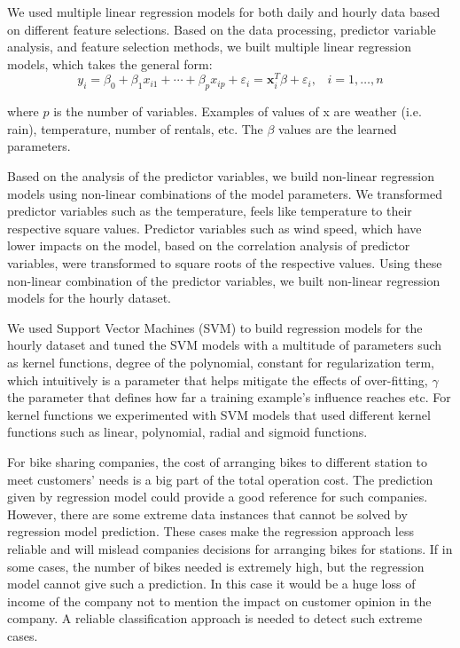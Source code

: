 \documentclass[12pt]{article}
\begin{document}


We used multiple linear regression models for both daily and hourly data based
on different feature selections.  Based on the data processing, predictor
variable analysis, and feature selection methods, we built multiple linear
regression models, which takes the general form:
\begin{equation}
y_i = \beta_0 + \beta_1x_{i1} + \cdots + \beta_px_{ip} + \varepsilon_i = {\mathbf
x}_i^{T}\beta + \varepsilon_i, \; \; \; i = 1, \ldots, n
\end{equation}

where $p$ is the number of variables. Examples of values of x are weather
(i.e. rain), temperature, number of rentals, etc. The $\beta$ values are the
learned parameters.



Based on the analysis of the predictor variables, we build non-linear
regression models using non-linear combinations of the model parameters. We
transformed predictor variables such as the temperature, feels like temperature
to their respective square values. Predictor variables such as wind speed, which
have lower impacts on the model, based on the correlation analysis of predictor
variables, were transformed to square roots of the respective values.  Using
these non-linear combination of the predictor variables, we built non-linear
regression models for the hourly dataset.



We used Support Vector Machines (SVM) to build regression models for the hourly
dataset and tuned the SVM models with a multitude of parameters such as kernel
functions, degree of the polynomial, constant for regularization term, which
intuitively is a parameter that helps mitigate the effects of over-fitting,
$\gamma$ the parameter that defines how far a training example's influence
reaches etc. For kernel functions we experimented with SVM models that used
different kernel functions such as linear, polynomial, radial and sigmoid
functions.



For bike sharing companies, the cost of arranging bikes to different station to
meet customers' needs is a big part of the total operation cost. The prediction
given by regression model could provide a good reference for such
companies. However, there are some extreme data instances that cannot be solved
by regression model prediction. These cases make the regression approach less
reliable and will mislead companies decisions for arranging bikes for
stations. If in some cases, the number of bikes needed is extremely high, but
the regression model cannot give such a prediction.  In this case it would be a
huge loss of income of the company not to mention the impact on customer
opinion in the company.  A reliable classification approach is needed to detect
such extreme cases.
\end{document}
